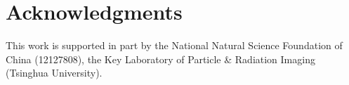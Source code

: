 \section{Acknowledgments}
This work is supported in part by the National Natural Science Foundation of China (12127808), the Key Laboratory of Particle \& Radiation Imaging (Tsinghua University). 
